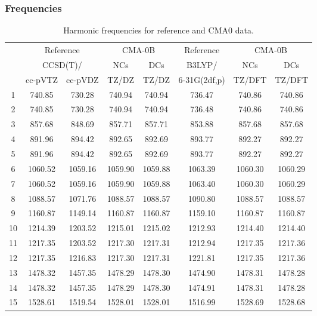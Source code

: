\documentclass[10pt,oneside]{article}
\begin{document}
\subsubsection*{Frequencies}
\begin{table}[h!]
\centering
\caption{Harmonic frequencies for reference and CMA0 data.}
\begin{tabular}{cccccccc}
\toprule
{} & \multicolumn{2}{c}{Reference} & \multicolumn{2}{c}{CMA-0B} &    Reference & \multicolumn{2}{c}{CMA-0B} \\
{} & \multicolumn{2}{c}{CCSD(T)/} &     NCs &     DCs &       B3LYP/ &     NCs &     DCs \\
{} &   cc-pVTZ & cc-pVDZ &   TZ/DZ &   TZ/DZ & 6-31G(2df,p) &  TZ/DFT &  TZ/DFT \\
\midrule
1  &    740.85 &  730.28 &  740.94 &  740.94 &       736.47 &  740.86 &  740.86 \\
2  &    740.85 &  730.28 &  740.94 &  740.94 &       736.48 &  740.86 &  740.86 \\
3  &    857.68 &  848.69 &  857.71 &  857.71 &       853.88 &  857.68 &  857.68 \\
4  &    891.96 &  894.42 &  892.65 &  892.69 &       893.77 &  892.27 &  892.27 \\
5  &    891.96 &  894.42 &  892.65 &  892.69 &       893.77 &  892.27 &  892.27 \\
6  &   1060.52 & 1059.16 & 1059.90 & 1059.88 &      1063.39 & 1060.30 & 1060.29 \\
7  &   1060.52 & 1059.16 & 1059.90 & 1059.88 &      1063.40 & 1060.30 & 1060.29 \\
8  &   1088.57 & 1071.76 & 1088.57 & 1088.57 &      1090.80 & 1088.57 & 1088.57 \\
9  &   1160.87 & 1149.14 & 1160.87 & 1160.87 &      1159.10 & 1160.87 & 1160.87 \\
10 &   1214.39 & 1203.52 & 1215.01 & 1215.02 &      1212.93 & 1214.40 & 1214.40 \\
11 &   1217.35 & 1203.52 & 1217.30 & 1217.31 &      1212.94 & 1217.35 & 1217.36 \\
12 &   1217.35 & 1216.83 & 1217.30 & 1217.31 &      1221.81 & 1217.35 & 1217.36 \\
13 &   1478.32 & 1457.35 & 1478.29 & 1478.30 &      1474.90 & 1478.31 & 1478.28 \\
14 &   1478.32 & 1457.35 & 1478.29 & 1478.30 &      1474.91 & 1478.31 & 1478.28 \\
15 &   1528.61 & 1519.54 & 1528.01 & 1528.01 &      1516.99 & 1528.69 & 1528.68 \\

\end{tabular}
\end{table}
\end{document}
